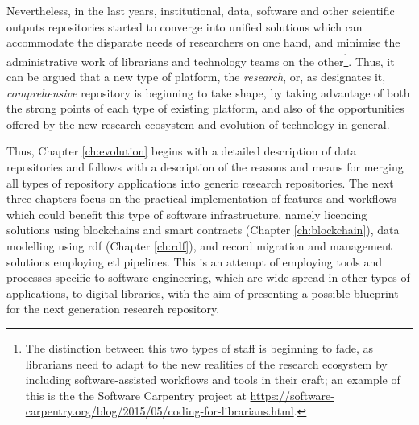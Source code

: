 Nevertheless, in the last years, institutional, data, software and other scientific outputs repositories started to converge into unified solutions which can accommodate the disparate needs of researchers on one hand, and minimise the administrative work of librarians and technology teams on the other\footnote{The distinction between this two types of staff is beginning to fade, as librarians need to adapt to the new realities of the research ecosystem by including software-assisted workflows and tools in their craft; an example of this is the the Software Carpentry project at \url{https://software-carpentry.org/blog/2015/05/coding-for-librarians.html}.}. Thus, it can be argued that a new type of platform, the \emph{research}, or, as \cite{cmu} designates it, \emph{comprehensive} repository is beginning to take shape, by taking advantage of both the strong points of each type of existing platform, and also of the opportunities offered by the new research ecosystem and evolution of technology in general.

Thus, Chapter \ref{ch:evolution} begins with a detailed description of data repositories and follows with a description of the reasons and means for merging all types of repository applications into generic research repositories. The next three chapters focus on the practical implementation of features and workflows which could benefit this type of software infrastructure, namely licencing solutions using blockchains and smart contracts (Chapter \ref{ch:blockchain}), data modelling using \gls{rdf} (Chapter \ref{ch:rdf}), and record migration and management solutions employing \gls{etl} pipelines. This is an attempt of employing tools and processes specific to software engineering, which are wide spread in other types of applications, to digital libraries, with the aim of presenting a possible blueprint for the next generation research repository.